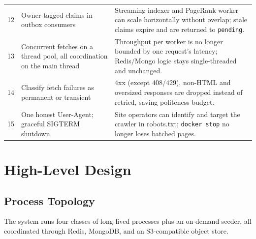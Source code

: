 \documentclass[11pt,a4paper]{article}
\newcommand{\code}[1]{\texttt{#1}}
\begin{document}
\begin{table}[H]
\begin{tabular}{p{}p{}p{}}
12 & Owner-tagged claims in outbox consumers & Streaming indexer and PageRank worker can scale horizontally without overlap; stale claims expire and are returned to \code{pending}.\\
13 & Concurrent fetches on a thread pool, all coordination on the main thread & Throughput per worker is no longer bounded by one request's latency; Redis/Mongo logic stays single-threaded and unchanged.\\
14 & Classify fetch failures as permanent or transient & 4xx (except 408/429), non-HTML and oversized responses are dropped instead of retried, saving politeness budget.\\
15 & One honest User-Agent; graceful SIGTERM shutdown & Site operators can identify and target the crawler in robots.txt; \code{docker stop} no longer loses batched pages.\\
\bottomrule
\end{tabular}
\end{table}

\section{High-Level Design}

\subsection{Process Topology}

The system runs four classes of long-lived processes plus an on-demand seeder, all coordinated through Redis, MongoDB, and an S3-compatible object store.
\end{document}
